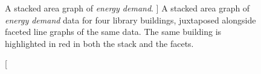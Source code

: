 \begin{figure}
	\centering
	\caption
	[
	    A stacked area graph of \textsl{energy demand}.
	]
	{
	    A stacked area graph of \textsl{energy demand} data for four library buildings, juxtaposed alongside faceted line graphs of the same data. The same building is highlighted in red in both the stack and the facets.
	}
	\centering
	\label{emu:fig:sandbox-stacks}
\end{figure}


